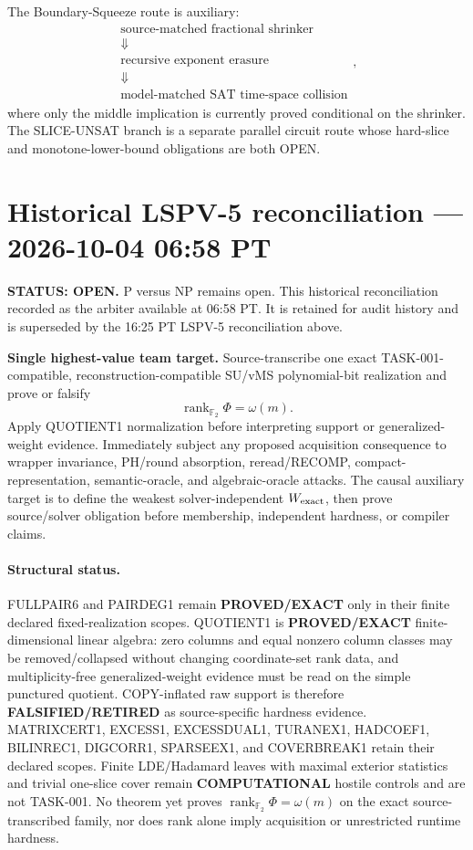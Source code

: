 \documentclass[11pt]{article}
\begin{document}
The Boundary-Squeeze route is auxiliary:
\[
\begin{gathered}
\text{source-matched fractional shrinker}
\\[-1mm]\Downarrow\\[-1mm]
\text{recursive exponent erasure}
\\[-1mm]\Downarrow\\[-1mm]
\text{model-matched SAT time-space collision}
\end{gathered},
\]
where only the middle implication is currently proved conditional on the shrinker. The
SLICE-UNSAT branch is a separate parallel circuit route whose hard-slice and monotone-lower-bound
obligations are both OPEN.


\section{Historical LSPV-5 reconciliation --- 2026-10-04 06:58 PT}
\textbf{STATUS: OPEN.} P versus NP remains open. This historical reconciliation recorded
 as the arbiter available at 06:58 PT.
It is retained for audit history and is superseded by the 16:25 PT LSPV-5 reconciliation above.

\begin{candidatebox}
\textbf{Single highest-value team target.}
Source-transcribe one exact TASK-001-compatible, reconstruction-compatible SU/vMS
polynomial-bit realization and prove or falsify
\[
\operatorname{rank}_{\mathbb F_2}\Phi=\omega(m).
\]
Apply QUOTIENT1 normalization before interpreting support or generalized-weight evidence.
Immediately subject any proposed acquisition consequence to wrapper invariance, PH/round
absorption, reread/RECOMP, compact-representation, semantic-oracle, and algebraic-oracle
attacks. The causal auxiliary target is to define the weakest solver-independent
\(W_{\rm exact}\), then prove source/solver obligation before membership, independent
hardness, or compiler claims.
\end{candidatebox}

\paragraph{Structural status.}
FULLPAIR6 and PAIRDEG1 remain \textbf{PROVED/EXACT} only in their finite declared
fixed-realization scopes. QUOTIENT1 is \textbf{PROVED/EXACT} finite-dimensional linear
algebra: zero columns and equal nonzero column classes may be removed/collapsed without
changing coordinate-set rank data, and multiplicity-free generalized-weight evidence must be
read on the simple punctured quotient. COPY-inflated raw support is therefore
\textbf{FALSIFIED/RETIRED} as source-specific hardness evidence. MATRIXCERT1, EXCESS1,
EXCESSDUAL1, TURANEX1, HADCOEF1, BILINREC1, DIGCORR1, SPARSEEX1, and COVERBREAK1
retain their declared scopes. Finite LDE/Hadamard leaves with maximal exterior statistics and
trivial one-slice cover remain \textbf{COMPUTATIONAL} hostile controls and are not TASK-001.
No theorem yet proves \(\operatorname{rank}_{\mathbb F_2}\Phi=\omega(m)\) on the
exact source-transcribed family, nor does rank alone imply acquisition or unrestricted runtime
hardness.
\end{document}
